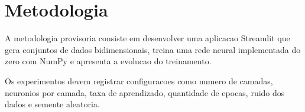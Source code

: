 \section{Metodologia}

A metodologia provisoria consiste em desenvolver uma aplicacao Streamlit que
gera conjuntos de dados bidimensionais, treina uma rede neural implementada do
zero com NumPy e apresenta a evolucao do treinamento.

Os experimentos devem registrar configuracoes como numero de camadas, neuronios
por camada, taxa de aprendizado, quantidade de epocas, ruido dos dados e
semente aleatoria.

